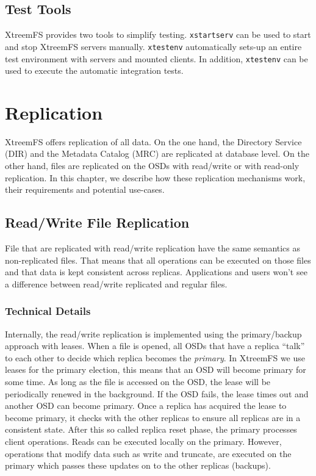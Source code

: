 \documentclass[a4paper,10pt]{book}
\begin{document}
\section{Test Tools}
XtreemFS provides two tools to simplify testing. \texttt{xstartserv} can be used to start and stop XtreemFS servers manually. \texttt{xtestenv} automatically sets-up an entire test environment with servers and mounted clients. In addition, \texttt{xtestenv} can be used to execute the automatic integration tests.

\chapter{Replication}

XtreemFS offers replication of all data. On the one hand, the Directory Service (DIR) and the Metadata Catalog (MRC) are replicated at database level. On the other hand, files are replicated on the OSDs with read/write or with read-only replication. In this chapter, we describe how these replication mechanisms work, their requirements and potential use-cases.

\section{Read/Write File Replication}
\label{sec:readwrite_replication}
File that are replicated with read/write replication have the same semantics as non-replicated files. That means that all operations can be executed on those files and that data is kept consistent across replicas. Applications and users won't see a difference between read/write replicated and regular files.

\subsection{Technical Details}
Internally, the read/write replication is implemented using the primary/backup approach with leases. When a file is opened, all OSDs that have a replica ``talk'' to each other to decide which replica becomes the \textit{primary}. In XtreemFS we use leases for the primary election, this means that an OSD will become primary for some time. As long as the file is accessed on the OSD, the lease will be periodically renewed in the background. If the OSD fails, the lease times out and another OSD can become primary.
Once a replica has acquired the lease to become primary, it checks with the other replicas to ensure all replicas are in a consistent state. After this so called replica reset phase, the primary processes client operations.
Reads can be executed locally on the primary. However, operations that modify data such as write and truncate, are executed on the primary which passes these updates on to the other replicas (backups).
\end{document}
